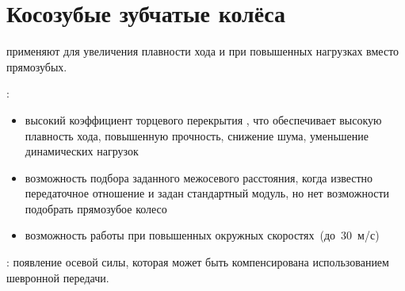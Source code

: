 \section{Косозубые зубчатые колёса}
 применяют для увеличения плавности хода и при повышенных нагрузках вместо прямозубых.

:
\begin{itemize}
	\item высокий коэффициент торцевого перекрытия , что обеспечивает высокую плавность хода, повышенную прочность, снижение шума, уменьшение динамических нагрузок
	\item возможность подбора заданного межосевого расстояния, когда известно передаточное отношение и задан стандартный модуль, но нет возможности подобрать прямозубое колесо
	\item возможность работы при повышенных окружных скоростях~(до~30~м/с)
\end{itemize}

: появление осевой силы, которая может быть компенсирована использованием шевронной передачи.
